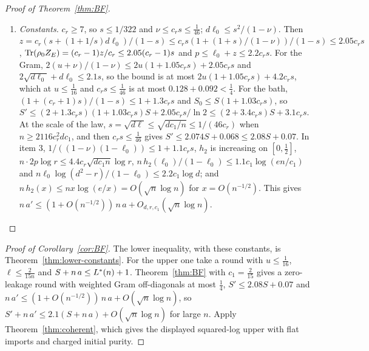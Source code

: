 \begin{proof}[Proof of Theorem~\ref{thm:BF}]
\begin{enumerate}[label=\arabic*.,itemsep=1pt]
\item \emph{Constants.} $c_r\ge7$, so $s\le1/322$ and $\nu\le c_rs\le\frac1{46}$; $d\ell_0\le s^2/(1-\nu)$. Then $z=c_r(s+(1+1/s)d\ell_0)/(1-s)\le c_rs(1+(1+s)/(1-\nu))/(1-s)\le2.05c_rs$,
$\operatorname{Tr}(\rho_0Z_E)=(c_r-1)z/c_r\le2.05(c_r-1)s$ and $p\le\ell_0+z\le2.2c_rs$. For the Gram, $2(u+\nu)/(1-\nu)\le2u(1+1.05c_rs)+2.05c_rs$ and $2\sqrt{d\ell_0}+d\ell_0\le2.1s$, so the bound is
at most $2u(1+1.05c_rs)+4.2c_rs$, which at $u\le\frac1{16}$ and $c_rs\le\frac1{46}$ is at most $0.128+0.092<\frac14$. For the bath, $(1+(c_r+1)s)/(1-s)\le1+1.3c_rs$ and
$S_0\le S(1+1.03c_rs)$, so $S'\le(2+1.3c_rs)(1+1.03c_rs)S+2.05c_rs/\ln2\le(2+3.4c_rs)S+3.1c_rs$. At the scale of the law, $s=\sqrt{d\ell}\le\sqrt{dc_1/n}\le1/(46c_r)$ when
$n\ge2116c_r^2dc_1$, and then $c_rs\le\frac1{46}$ gives $S'\le2.074S+0.068\le2.08S+0.07$. In item 3, $1/((1-\nu)(1-\ell_0))\le1+1.1c_rs$, $h_2$ is increasing on $[0,\frac12]$,
$n\cdot2p\log r\le4.4c_r\sqrt{dc_1n}\log r$, $n\,h_2(\ell_0)/(1-\ell_0)\le1.1c_1\log(en/c_1)$ and $n\ell_0\log(d^2-r)/(1-\ell_0)\le2.2c_1\log d$; and $n\,h_2(x)\le nx\log(e/x)=O(\sqrt n\log n)$
for $x=O(n^{-1/2})$. This gives $n\,a'\le(1+O(n^{-1/2}))\,n\,a+O_{d,r,c_1}(\sqrt n\log n)$.\qedhere
\end{enumerate}
\end{proof}

\begin{proof}[Proof of Corollary~\ref{cor:BF}]
The lower inequality, with these constants, is Theorem~\ref{thm:lower-constants}. For the upper one take a round with $u\le\frac1{16}$, $\ell\le\frac2{15n}$ and $S+n\,a\le L^{*}(n)+1$. Theorem~\ref{thm:BF} with $c_1=\frac2{15}$
gives a zero-leakage round with weighted Gram off-diagonals at most $\frac14$, $S'\le2.08S+0.07$ and $n\,a'\le(1+O(n^{-1/2}))\,n\,a+O(\sqrt n\log n)$, so
$S'+n\,a'\le2.1(S+n\,a)+O(\sqrt n\log n)$ for large $n$. Apply Theorem~\ref{thm:coherent}, which gives the displayed squared-log upper with flat imports and charged initial purity.
\end{proof}
